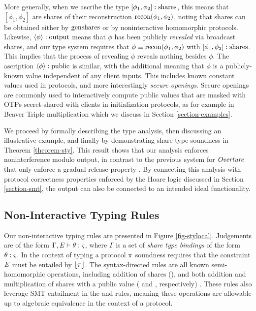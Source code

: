 More generally, when we ascribe the type $[\phi_1,\phi_2] : \mathrm{shares}$,
this means that $[\phi_1,\phi_2]$ are shares of their reconstruction
$\mathrm{recon}(\phi_1,\phi_2)$, noting that shares can be obtained either by
$\mathrm{genshares}$ or by noninteractive homomorphic protocols.  Likewise,
$\langle \phi \rangle : \mathrm{output}$ means that $\phi$ has been publicly
\emph{revealed} via broadcast shares, and our type system requires
that $\phi \equiv \mathrm{recon}(\phi_1, \phi_2)$ with $[\phi_1,\phi_2] :
\mathrm{shares}$. This implies that the process of revealing $\phi$ reveals
nothing besides $\phi$.  The ascription $\langle \phi \rangle : \mathrm{public}$ is
similar, with the additional meaning that $\phi$ is a publicly-known
value independent of any client inputs. This includes known constant
values used in protocols, and more interestingly \emph{secure
openings}. Secure openings are commonly used to interactively compute
public values that are masked with OTPs secret-shared with clients in
initialization protocols, as for example in Beaver Triple
multiplication which we discuss in Section \ref{section-examples}.

\stylocalfig

We proceed by formally describing the type analysis, then
discussing an illustrative example, and finally by demonstrating share
type soundness in Theorem \ref{theorem-sty}. This result shows that
our analysis enforces noninterference modulo output, in contrast to
the previous system for $\mathit{Overture}$ that only enforce a gradual release
property \cite{skalka-near-esop25}. By connecting this analysis with
protocol correctness properties enforced by the Hoare logic discussed
in Section \ref{section-smt}, the output can also be connected to an
intended ideal functionality.

\subsection{Non-Interactive Typing Rules}

Our non-interactive typing rules are presented in Figure
\ref{fig-stylocal}. Judgements are of the form $\Gamma, \mathit{E} \vdash
\theta : \varsigma$, where $\Gamma$ is a set of \emph{share type bindings} of
the form $\theta : \varsigma$. In the context of typing a protocol $\pi$
soundness requires that the constraint $\mathit{E}$ must be entailed by
$\lfloor \pi \rfloor$. The syntax-directed rules are all known semi-homomorphic operations,
including addition of shares (), and both addition and
multiplication of shares with a public value ( and
, respectively) \cite{10.1007/978-3-030-68869-1_3}.
These rules also leverage SMT entailment in the 
and  rules, meaning these operations are
allowable up to algebraic equivalence in the context of a protocol.


